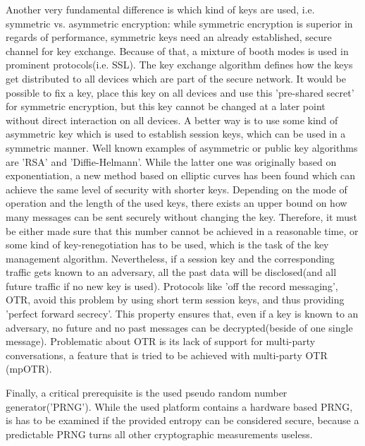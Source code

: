 \documentclass[a4paper,12pt,twoside]{memoir}
\begin{document}
 Another very fundamental difference is which kind of keys are used, i.e. symmetric vs. asymmetric encryption: while symmetric encryption is superior in
 regards of performance, symmetric keys need an already established, secure channel for key exchange. Because of
 that, a mixture of booth modes is used in prominent protocols(i.e. SSL\cite{rfc2246}).
 The key exchange algorithm defines how the keys get distributed to all devices which are part of the secure network.
 It would be possible to fix a key, place this key on all devices and use this 'pre-shared secret' for symmetric
 encryption, but this key cannot be changed at a later point without direct interaction on all devices. A better way is to use some
 kind of asymmetric key which is used to establish session keys, which can be used in a symmetric manner. Well known examples
 of asymmetric or public key algorithms are 'RSA'\cite{Rivest:1978:MOD:359340.359342} and 'Diffie-Helmann'\cite{1055638}. While the latter one was originally based on exponentiation,
 a new method based on elliptic curves has been found which can achieve the same level of security with shorter keys.
 Depending on the mode of operation and the length of the used keys, there exists an upper bound on
 how many messages can be sent securely without changing the key. Therefore, it must be either made sure that this number 
 cannot be achieved in a reasonable time, or some kind of key-renegotiation has to be used, which is the task of the key management algorithm.
 Nevertheless, if a session key and the corresponding traffic gets known to an adversary, all the past data will be disclosed(and all future traffic
 if no new key is used). Protocols like 'off the record messaging', OTR\cite{Borisov:2004:OCW:1029179.1029200}, avoid this problem by using short term session keys, and thus providing
 'perfect forward secrecy'. This property ensures that, even if a key is known to an adversary, no future and no past messages can be decrypted(beside of
 one single message). Problematic about OTR is its lack of support for multi-party conversations, a feature that is tried to be achieved with multi-party OTR
 (mpOTR)\cite{Goldberg:2009:MOM:1653662.1653705,}\cite{Liu:2013:IGO:2517840.2517867}.
 
 Finally, a critical prerequisite is the used pseudo random number generator('PRNG').
 While the used platform contains a hardware based PRNG, is has to be examined if the provided entropy can be considered
 secure, because a predictable PRNG turns all other cryptographic measurements useless.
 
\end{document}
